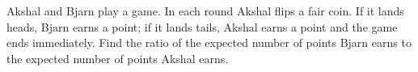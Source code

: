 Akshal and Bjarn play a game. In each round Akshal flips a fair coin. If it lands heads, Bjarn earns a point; if it lands tails, Akshal earns a point and the game ends immediately. Find the ratio of the expected number of points Bjarn earns to the expected number of points Akshal earns.
